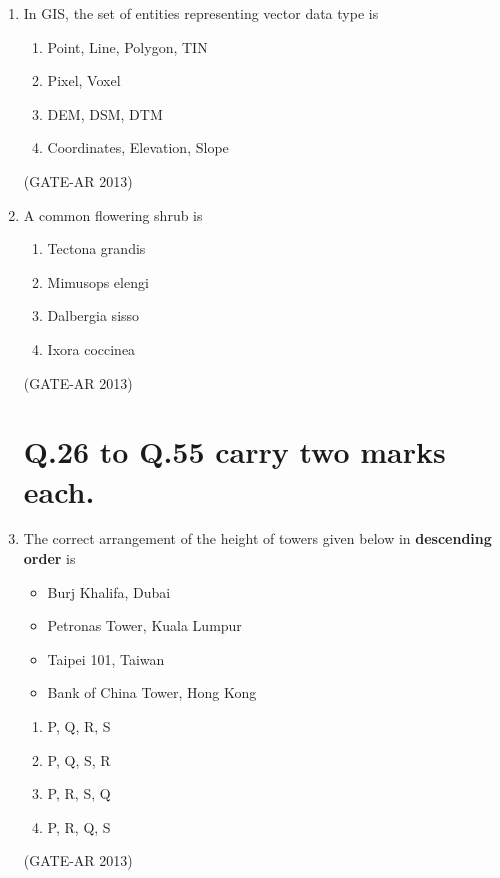 \documentclass[a4paper,10pt]{article}
\begin{document}
\begin{enumerate}
    \item In GIS, the set of entities representing vector data type is 
    \begin{enumerate}
        \item Point, Line, Polygon, TIN
        \item Pixel, Voxel
        \item DEM, DSM, DTM
        \item Coordinates, Elevation, Slope
    \end{enumerate}
    \hfill (GATE-AR 2013)

    \item A common flowering shrub is 
    \begin{multicols}{4}
	\begin{enumerate}
        \item Tectona grandis
        \item Mimusops elengi
        \item Dalbergia sisso
        \item Ixora coccinea
    \end{enumerate}
	\end{multicols}
    \hfill (GATE-AR 2013)

\section*{Q.26 to Q.55 carry two marks each.}

    \item The correct arrangement of the height of towers given below in \textbf{descending order} is
    \begin{itemize}
    \item Burj Khalifa, Dubai
    \item Petronas Tower, Kuala Lumpur
    \item Taipei 101, Taiwan
    \item Bank of China Tower, Hong Kong
    \end{itemize}
    \begin{multicols}{2}
	\begin{enumerate}
        \item P, Q, R, S
        \item P, Q, S, R
        \item P, R, S, Q
        \item P, R, Q, S
    \end{enumerate}
	\end{multicols}
    \hfill (GATE-AR 2013)


\end{enumerate}
\end{document}
